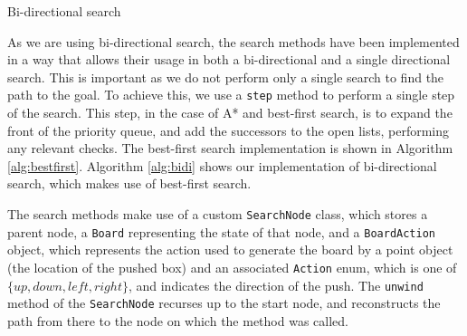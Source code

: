 \documentclass[a4paper,11pt]{article}
\begin{document}
\begin{algorithm}
  \DontPrintSemicolon

\caption{Bi-directional search}
\label{alg:bidi}
\end{algorithm}

As we are using bi-directional search, the search methods have been implemented
in a way that allows their usage in both a bi-directional and a single
directional search. This is important as we do not perform only a single search
to find the path to the goal. To achieve this, we use a \texttt{step} method to
perform a single step of the search. This step, in the case of A* and best-first
search, is to expand the front of the priority queue, and add the successors to
the open lists, performing any relevant checks. The best-first search
implementation is shown in Algorithm \ref{alg:bestfirst}. Algorithm
\ref{alg:bidi} shows our implementation of bi-directional search, which makes
use of best-first search.

The search methods make use of a custom \texttt{SearchNode} class, which stores
a parent node, a \texttt{Board} representing the state of that node, and a
\texttt{BoardAction} object, which represents the action used to generate the
board by a point object (the location of the pushed box) and an associated
\texttt{Action} enum, which is one of $\{up, down, left, right\}$, and indicates
the direction of the push. The \texttt{unwind} method of the \texttt{SearchNode}
recurses up to the start node, and reconstructs the path from there to the node
on which the method was called.
\end{document}
